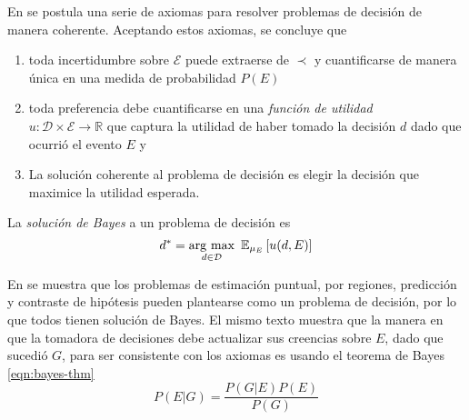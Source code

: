 \documentclass[main.tex]{subfiles}
\begin{document}
En \cite{bernardo} se postula una serie de axiomas para resolver problemas de decisión de manera coherente. Aceptando estos axiomas, se concluye que 
\begin{enumerate}[label=\roman*]
	\item toda incertidumbre sobre $\mathcal{E}$ puede extraerse de $\prec$ y cuantificarse de manera única en una medida de probabilidad $P(E)$
	\item toda preferencia debe cuantificarse en una \textit{función de utilidad} \\  $u: \mathcal{D}\times\mathcal{E} \to \mathbb{R}$  que captura la utilidad de haber tomado la decisión $d$ dado que ocurrió el evento $E$ y
	\item La solución coherente al problema de decisión es elegir la decisión que maximice la utilidad esperada.
\end{enumerate}

\begin{definition}
	La \textit{solución de Bayes} a un problema de decisión es 
	\begin{equation}
	d^* = \argmax_{d \in\mathcal{D}} \ \mathbb{E}_{\mu_E}\left[u(d, E)\right]
	\end{equation}
\end{definition}

En \cite{bernardo} se muestra que los problemas de estimación puntual, por regiones, predicción y contraste de hipótesis pueden plantearse como un problema de decisión, por lo que todos tienen solución de Bayes. El mismo texto muestra que la manera en que la tomadora de decisiones debe actualizar sus creencias sobre $E$, dado que sucedió $G$,  para ser consistente con los axiomas es usando el teorema de Bayes \eqref{eqn:bayes-thm}
\begin{equation*}
	P(E|G) = \frac{P(G|E)P(E)}{P(G)}	
\end{equation*}
\end{document}
